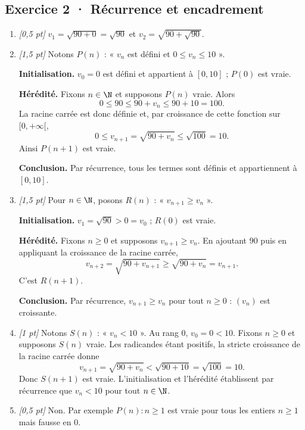 \subsection*{Exercice 2 · Récurrence et encadrement}\begin{enumerate}

\item \textit{[0,5 pt]} $v_1=\sqrt{90+0}=\sqrt{90}$ et $v_2=\sqrt{90+\sqrt{90}}$.

\item \textit{[1,5 pt]} Notons $P(n)$ : « $v_n$ est défini et $0\le v_n\le 10$ ».
\par\smallskip\textbf{Initialisation.} $v_0=0$ est défini et appartient à $[0,10]$ ; $P(0)$ est vraie.
\par\smallskip\textbf{Hérédité.} Fixons $n\in\N$ et supposons $P(n)$ vraie. Alors
\[0\le 90\le 90+v_n\le 90+10=100.\]
La racine carrée est donc définie et, par croissance de cette fonction sur $[0,+\infty[$,
\[0\le v_{n+1}=\sqrt{90+v_n}\le\sqrt{100}=10.\]
Ainsi $P(n+1)$ est vraie.
\par\smallskip\textbf{Conclusion.} Par récurrence, tous les termes sont définis et appartiennent à $[0,10]$.

\item \textit{[1,5 pt]} Pour $n\in\N$, posons $R(n)$ : « $v_{n+1}\ge v_n$ ».
\par\smallskip\textbf{Initialisation.} $v_1=\sqrt{90}>0=v_0$ ; $R(0)$ est vraie.
\par\smallskip\textbf{Hérédité.} Fixons $n\ge0$ et supposons $v_{n+1}\ge v_n$. En ajoutant $90$ puis en appliquant la croissance de la racine carrée,
\[v_{n+2}=\sqrt{90+v_{n+1}}\ge\sqrt{90+v_n}=v_{n+1}.\]
C'est $R(n+1)$.
\par\smallskip\textbf{Conclusion.} Par récurrence, $v_{n+1}\ge v_n$ pour tout $n\ge0$ : $(v_n)$ est croissante.

\item \textit{[1 pt]} Notons $S(n)$ : « $v_n<10$ ». Au rang $0$, $v_0=0<10$.
Fixons $n\ge0$ et supposons $S(n)$ vraie. Les radicandes étant positifs, la stricte croissance de la racine carrée donne
\[v_{n+1}=\sqrt{90+v_n}<\sqrt{90+10}=\sqrt{100}=10.\]
Donc $S(n+1)$ est vraie. L'initialisation et l'hérédité établissent par récurrence que $v_n<10$ pour tout $n\in\N$.

\item \textit{[0,5 pt]} Non. Par exemple $P(n):n\ge1$ est vraie pour tous les entiers $n\ge1$ mais fausse en $0$.

\end{enumerate}


